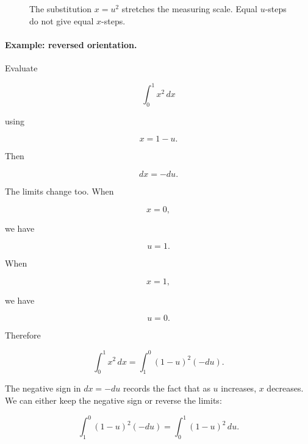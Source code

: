 \begin{figure}[h]
\centering
{}
\caption{The substitution \(x=u^2\) stretches the measuring scale.  Equal \(u\)-steps do not give equal \(x\)-steps.}
\label{fig:substitution-stretching-scale}
\end{figure}

\paragraph{Example: reversed orientation.}
Evaluate

\[
\int_0^1 x^2\,dx
\]

using

\[
x=1-u.
\]

Then

\[
dx=-du.
\]

The limits change too.  When

\[
x=0,
\]

we have

\[
u=1.
\]

When

\[
x=1,
\]

we have

\[
u=0.
\]

Therefore

\[
\int_0^1 x^2\,dx
=
\int_1^0 (1-u)^2(-du).
\]

The negative sign in \(dx=-du\) records the fact that as \(u\) increases, \(x\)
decreases.  We can either keep the negative sign or reverse the limits:

\[
\int_1^0 (1-u)^2(-du)
=
\int_0^1 (1-u)^2\,du.
\]

